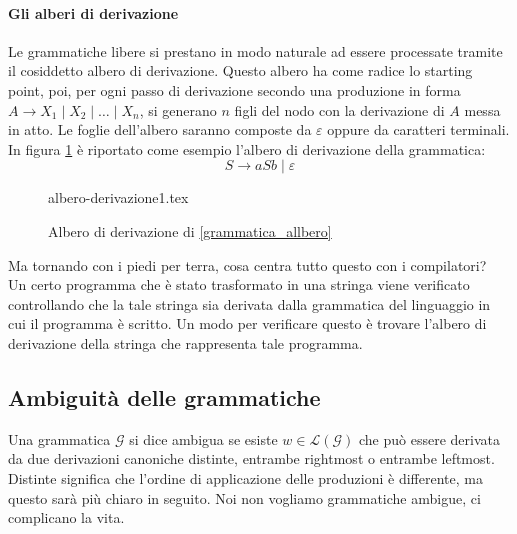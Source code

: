 \documentclass[class=book, crop=false, oneside, 12pt]{standalone}
\begin{document}
\paragraph{Gli alberi di derivazione}
Le grammatiche libere si prestano in modo naturale ad essere processate tramite il cosiddetto albero di derivazione. Questo albero ha come radice lo starting point, poi, per ogni passo di derivazione secondo una produzione in forma \(A \to X_1 \mid X_2 \mid\dots\mid X_n \), si generano \(n\) figli del nodo con la derivazione di \(A\) messa in atto.
Le foglie dell’albero saranno composte da \(\varepsilon\) oppure da caratteri terminali. In figura \ref{albero_di_derivazione} è riportato come esempio l'albero di derivazione della grammatica:
\begin{equation}
    S \to aSb \mid \varepsilon
    \label{grammatica_allbero}
\end{equation}
\begin{figure}[H]
	\centering
    {albero-derivazione1.tex}
    \caption{Albero di derivazione di \ref{grammatica_allbero}}
    \label{albero_di_derivazione}
\end{figure}
Ma tornando con i piedi per terra, cosa centra tutto questo con i compilatori?\\
Un certo programma che è stato trasformato in una stringa viene verificato controllando che la tale stringa sia derivata dalla grammatica del linguaggio in cui il programma è scritto. Un modo per verificare questo è trovare l’albero di derivazione della stringa che rappresenta tale programma.

\subsection{Ambiguità delle grammatiche}\label{sec:ambiguity}
Una grammatica \(\mathcal{G}\) si dice ambigua se esiste \(w \in \mathcal{L}(\mathcal{G})\) che può essere derivata da due derivazioni canoniche distinte, entrambe rightmost o entrambe leftmost. Distinte significa che l'ordine di applicazione delle produzioni è differente, ma questo sarà più chiaro in seguito. Noi non vogliamo grammatiche ambigue, ci complicano la vita. 
\end{document}
